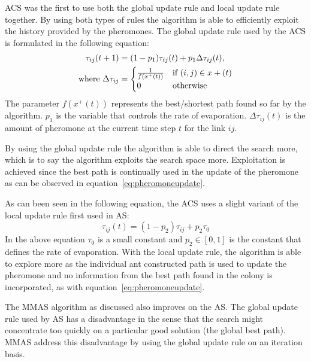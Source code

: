 \gls{ACS} was the first to use both the global update rule and local update rule together\cite{CompuIntelligenceIntro}. By using both types of rules the algorithm is able to efficiently exploit the history provided by the pheromones\cite{CompuIntelligenceIntro}. The global update rule used by the \gls{ACS} is formulated in the following equation\cite{CompuIntelligenceIntro}:
\begin{align}
\label{eq:pheromoneupdate}
	\tau_{ij}(t + 1) &= (1 - p_1)\tau_{ij}(t) + p_1\Delta\tau_{ij}(t),\\
	\text{where }\Delta\tau_{ij} &= \notag
	\begin{cases}
		\frac{1}{f(x^+(t))} &\text{if $(i,j) \in x+(t)$}\\
		0 &\text{otherwise}
	\end{cases}
\end{align}
The parameter $f(x^+(t))$ represents the best/shortest path found so far by the algorithm\cite{CompuIntelligenceIntro}. $p_1$ is the variable that controls the rate of evaporation. $\Delta\tau_{ij}(t)$ is the amount of pheromone at the current time step $t$ for the link $ij$.

By using the global update rule the algorithm is able to direct the search more, which is to say the algorithm exploits the search space more. Exploitation is achieved since the best path is continually used in the update of the pheromone as can be observed in equation~\ref{eq:pheromoneupdate}\cite{CompuIntelligenceIntro,FundamentalSwarm}.

As can been seen in the following equation, the \gls{ACS} uses a slight variant of the local update rule first used in \gls{AS}\cite{CompuIntelligenceIntro}:
\begin{equation}
	\tau_{ij}(t) = (1 - p_2)\tau_{ij} + p_2\tau_0
\end{equation}
In the above equation $\tau_0$ is a small constant and $p_2 \in [0,1]$ is the constant that defines the rate of evaporation\cite{CompuIntelligenceIntro}. With the local update rule, the algorithm is able to explore more as the individual ant constructed path is used to update the pheromone and no information from the best path found in the colony is incorporated, as with equation~\ref{eq:pheromoneupdate}\cite{CompuIntelligenceIntro,FundamentalSwarm}.

The \gls{MMAS} algorithm as discussed also improves on the \gls{AS}. The global update rule used by \gls{AS} has a disadvantage in the sense that the search might concentrate too quickly on a particular good solution (the global best path)\cite{FundamentalSwarm}. \gls{MMAS} address this disadvantage by using the global update rule on an iteration basis\cite{FundamentalSwarm}.

